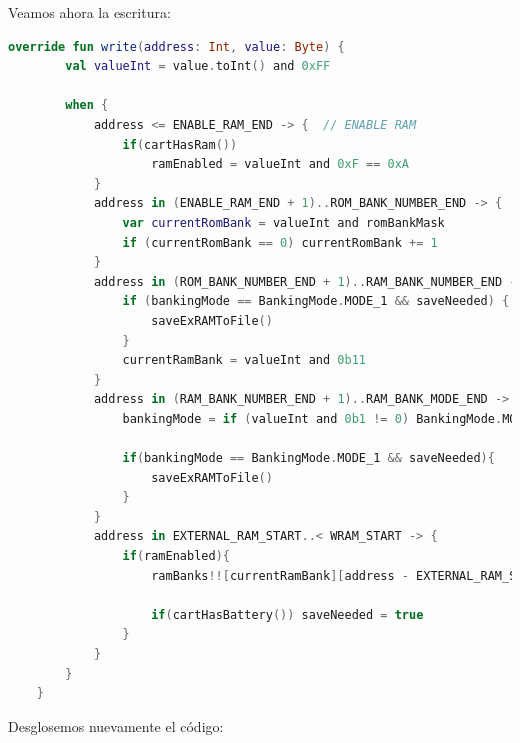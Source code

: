 Veamos ahora la escritura:

\begin{lstlisting}[language=Kotlin, caption={Escritura en regiones ROM.}, label={code:romwritekotlin}]
    override fun write(address: Int, value: Byte) {
        val valueInt = value.toInt() and 0xFF

        when {
            address <= ENABLE_RAM_END -> {  // ENABLE RAM
                if(cartHasRam())
                    ramEnabled = valueInt and 0xF == 0xA
            }
            address in (ENABLE_RAM_END + 1)..ROM_BANK_NUMBER_END -> {                           // ROM BANK SELECTION
                var currentRomBank = valueInt and romBankMask
                if (currentRomBank == 0) currentRomBank += 1
            }
            address in (ROM_BANK_NUMBER_END + 1)..RAM_BANK_NUMBER_END -> {                      // RAM BANK SELECTION
                if (bankingMode == BankingMode.MODE_1 && saveNeeded) {
                    saveExRAMToFile()
                }
                currentRamBank = valueInt and 0b11
            }
            address in (RAM_BANK_NUMBER_END + 1)..RAM_BANK_MODE_END -> {                        // BANKING MODE
                bankingMode = if (valueInt and 0b1 != 0) BankingMode.MODE_1 else BankingMode.MODE_0

                if(bankingMode == BankingMode.MODE_1 && saveNeeded){
                    saveExRAMToFile()
                }
            }
            address in EXTERNAL_RAM_START..< WRAM_START -> {                                       // WRITE TO EXTERNAL RAM
                if(ramEnabled){
                    ramBanks!![currentRamBank][address - EXTERNAL_RAM_START] = value

                    if(cartHasBattery()) saveNeeded = true
                }
            }
        }
    }
\end{lstlisting}

Desglosemos nuevamente el código:

